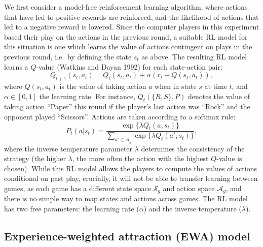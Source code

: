 \documentclass[smallextended]{svjour3}       %
\begin{document}
We first consider a model-free reinforcement learning algorithm, where
actions that have led to positive rewards are reinforced, and the
likelihood of actions that led to a negative reward is lowered. Since
the computer players in this experiment based their play on the actions
in the previous round, a suitable RL model for this situation is one
which learns the value of actions contingent on plays in the previous
round, i.e.~by defining the state \(s_{t}\) as above. The resulting RL
model learns a \(Q\)-value (Watkins and Dayan 1992) for each
state-action pair:
\[Q_{t+1}(s_{t},a_{t}) = Q_{t}(s_{t},a_{t}) + \alpha \left( r_{t}  - Q(s_{t},a_{t}) \right) ,\]
where \(Q(s_{t},a_{t})\) is the value of taking action \(a\) when in
state \(s\) at time \(t\), and \(\alpha \in [0,1]\) the learning rate.
For instance, \(Q_t(\{R,S\},P)\) denotes the value of taking action
``Paper'' this round if the player's last action was ``Rock'' and the
opponent played ``Scissors''. Actions are taken according to a softmax
rule: \begin{equation}
\label{eq:softmax}
P_{t}(a|s_t) = \frac{\exp \{ \lambda Q_{t}(a,s_t) \}}{\sum_{a' \in \mathcal{A}_g} \exp \{\lambda  Q_{t}(a',s_t) \}}, 
\end{equation} where the inverse temperature parameter \(\lambda\)
determines the consistency of the strategy (the higher \(\lambda\), the
more often the action with the highest \(Q\)-value is chosen). While
this RL model allows the players to compute the values of actions
conditional on past play, crucially, it will not be able to transfer
learning between games, as each game has a different state space
\(\mathcal{S}_g\) and action space \(\mathcal{A}_g\), and there is no
simple way to map states and actions across games. The RL model has two
free parameters: the learning rate (\(\alpha\)) and the inverse
temperature (\(\lambda\)).

\hypertarget{experience-weighted-attraction-ewa-model}{%
\subsection{Experience-weighted attraction (EWA)
model}\label{experience-weighted-attraction-ewa-model}}
\end{document}
